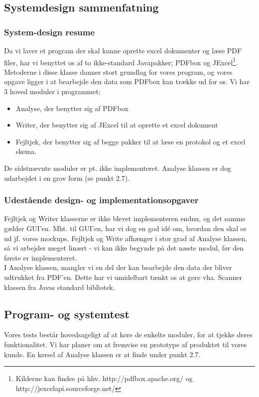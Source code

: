 \documentclass[11pt]{article}
\begin{document}
\subsection{Systemdesign sammenfatning}
\subsubsection{System-design resume}
Da vi laver et program der skal kunne oprette excel dokumenter og læse PDF filer, har vi benyttet os af to ikke-standard Javapakker; PDFbox og JExcel\footnote{Kilderne kan findes på hhv. http://pdfbox.apache.org/ og http://jexcelapi.sourceforge.net/}. Metoderne i disse klasse danner stort grundlag for vores program, og vores opgave ligger i at bearbejde den data som PDFbox kan trække ud for os. Vi har 3 hoved moduler i programmet; \begin{itemize}

\item Analyse, der benytter sig af PDFbox
\item Writer, der benytter sig af JExcel til at oprette et excel dokument
\item Fejltjek, der benytter sig af begge pakker til at læse en protokol og et excel skema.
\end{itemize}
De sidstnævnte moduler er pt. ikke implementeret.
Analyse klassen er dog udarbejdet i en grov form (se punkt 2.7).
\subsubsection{Udestående design- og implementationsopgaver}
Fejltjek og Writer klasserne er ikke blevet implementeren endnu, og det samme gælder GUI'en. Mht. til GUI'en, har vi dog en god idé om, hvordan den skal se ud jf. vores mockups. Fejltjek og Write afhænger i stor grad af Analyse klassen, så vi arbejder meget linært - vi kan ikke begynde på det næste modul, før den første er implementeret.\\I Analyse klassen, mangler vi en del der kan bearbejde den data der bliver udtrukket fra PDF'en. Dette har vi umidelbart tænkt os at gøre vha. Scanner klassen fra Javas standard bibliotek.

\subsection{Program- og systemtest}
Vores tests består hovedsageligt af at køre de enkelte moduler, for at tjekke deres funktionalitet. Vi har planer om at fremvise en prototype af produktet til vores kunde. En kørsel af Analyse klassen er at finde under punkt 2.7.
\end{document}
